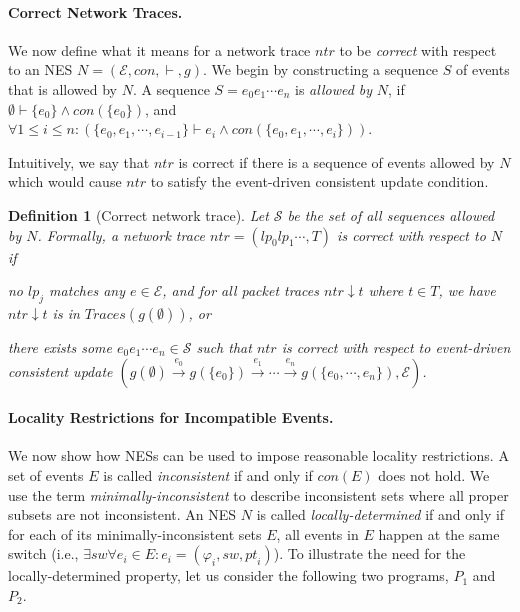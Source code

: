 \documentclass[pldi-cameraready]{sigplanconf}
\newcommand{\port}{\ensuremath{\mathit{pt}}}
\newcommand{\switch}{\ensuremath{\mathit{sw}}}
\newcommand{\lpt}{\ensuremath{\mathit{lp}}}
\newcommand{\ntr}{\ensuremath{\mathit{ntr}}}
\newcommand{\PTraces}{\ensuremath{\mathit{Traces}}}
\newtheorem{definition}{Definition}
\begin{document}
\paragraph*{Correct Network Traces.}
\label{sec:correct_trace}
We now define what it means for a network trace $\ntr$
to be {\em correct} with respect to an
NES $N=(\mathcal{E},con,\vdash,g)$. We begin by constructing a
sequence $S$ of events that is allowed by $N$. A sequence $S = e_0e_1 \cdots e_n$ is {\em allowed by} $N$, if 
$\emptyset \vdash \{e_0\} \land con(\{e_0\})$, and
$\forall 1 \leq i \leq n: (\{e_0,e_1,\cdots,e_{i-1}\} \vdash e_i \allowbreak\land\allowbreak con(\{e_0,e_1,\cdots,e_{i}\}))$.

Intuitively, we say that $\ntr$ is correct if there is a sequence of events allowed by $N$
which would cause $\ntr$ to satisfy the event-driven consistent update condition.


\begin{definition}[Correct network trace]
\label{def:corr_trace}Let $\mathcal{S}$ be the set of all sequences allowed by $N$. 
Formally, a network trace $\ntr=(\lpt_0\lpt_1\cdots,T)$ is {\em correct} with respect to $N$ if
\begin{compactitem}
\item no $\lpt_j$ matches any $e \in \mathcal{E}$, and for all packet traces $\ntr{\downarrow}t$ where $t \in T$, 
we have $\ntr{\downarrow}t$ is in $\PTraces(g(\emptyset))$, or
\item there exists some $e_0 e_1 \cdots e_n \in \mathcal{S}$ such that
$\ntr$ is correct with respect to event-driven consistent update $(g(\emptyset) \xrightarrow{e_0} g(\{e_0\}) \xrightarrow{e_1} \cdots \xrightarrow{e_n} g(\{e_0,\cdots,e_n\}),\mathcal{E})$.
\end{compactitem}
\end{definition}



\paragraph*{Locality Restrictions for Incompatible Events.}
\label{sec:locrestr}
We now show how NESs can be used to impose reasonable locality
restrictions. A set of events $E$ is called {\em
  inconsistent} if and only if $con(E)$ does not hold.  We use the term {\em
  minimally-inconsistent} to describe inconsistent sets where all proper subsets are
not inconsistent.
An NES $N$ is called {\em locally-determined} if and only if for each of its
minimally-inconsistent sets $E$, all events in $E$ happen
at the same switch (i.e., $\exists \switch \forall e_i \in E : e_i = (\varphi_i,\switch,\port_i)$).
To illustrate the need for the locally-determined property, let us
consider the following two programs, $P_1$ and $P_2$.
\end{document}
